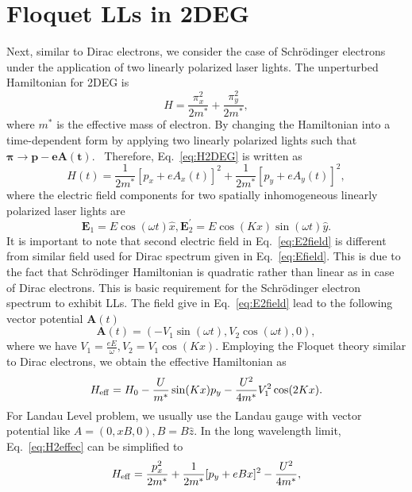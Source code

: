 \documentclass[aps,prl,showpacs,twocolumn,amsmath,amssymb,superscriptaddress]{revtex4-2}
\renewcommand{\vec}[1]{\mathbf{#1}}
\begin{document}
\section{Floquet LLs in 2DEG}
Next, similar to Dirac electrons, we consider the case of Schr\"{o}dinger electrons under the application of two linearly polarized laser lights. The unperturbed Hamiltonian for 2DEG is%
\begin{equation}\label{eq:H2DEG}
H=\frac{\pi_{x}^{2}}{2m^{\ast}}+\frac{\pi_{y}^{2}}{2m^{\ast}},
\end{equation}
where $m^{\ast}$ is the effective mass of electron. By changing the Hamiltonian into a time-dependent form by applying two linearly polarized lights
such that $\vec{\pi\rightarrow p-eA(t)}$. \ Therefore, Eq.~\eqref{eq:H2DEG} is written as%
\begin{equation}\label{eq:H2time}
H(t)=\frac{1}{2m^{\ast}}[p_{x}+eA_{x}(t)]^{2}+\frac{1}{2m^{\ast}}[p_{y}%
+eA_{y}(t)]^{2},
\end{equation}
where the electric field components for two spatially inhomogeneous linearly polarized laser lights are
\begin{equation} \label{eq:E2field}
\vec{E}_{1} =E\cos (\omega t)\hat{x},\vec{E}_{2}^{\prime}=E\cos
(Kx)\sin (\omega t)\hat{y}.
\end{equation}%
It is important to note that second electric field in Eq.~\eqref{eq:E2field} is different from similar field used for Dirac spectrum given in Eq.~\eqref{eq:Efield}. This is due to the fact that Schr\"{o}dinger Hamiltonian is quadratic rather than linear as in case of Dirac electrons. This is basic requirement for the Schr\"{o}dinger electron spectrum to exhibit LLs. The field give in Eq.~\eqref{eq:E2field} lead to the following vector potential $\vec{A}(t)$
\begin{equation}\label{eq:A2vector}
\vec{A}(t)=(-V_1\sin (\omega t), V_2 \cos (\omega t),0),
\end{equation}%
where we have $V_{1}=\frac{eE}{\omega },V_{2}=V_1\cos(Kx)$. Employing the Floquet theory similar to Dirac electrons, we obtain the effective Hamiltonian as%
\begin{equation}\label{eq:H2effec}
	H_{\rm eff}  =H_{0} -\frac{U}{m^{\ast}}\sin (Kx) p_{y} -\frac{U^2}{4m^{\ast}}V_{1}^{2}\cos(2Kx).
\end{equation}
For Landau Level problem, we usually use the Landau gauge with vector potential
like $A=(0,xB,0),B=B\hat{z}$. In the long wavelength limit, Eq.~\eqref{eq:H2effec} can be simplified to
\begin{equation} \label{eq:H2Feffect}
H_{\rm eff}=\frac{p_{x}^{2}}{2m^{\ast}}+\frac{1}{2m^{\ast}}[p_{y}%
+eBx]^{2}-\frac{U^{2}}{4m^{\ast}},
\end{equation}
\end{document}
